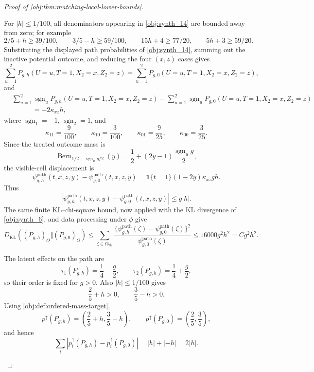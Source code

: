 \documentclass[11pt]{article}
\begin{document}
\begin{proof}[Proof of \cref{obj:thm:matching-local-lower-bounds}]
\begin{enumerate}
For \(|h|\le1/100\), all denominators appearing in \cref{obj:synth_14} are bounded away from zero; for example
\[
2/5+h\ge39/100,\qquad
3/5-h\ge59/100,\qquad
15h+4\ge77/20,\qquad
5h+3\ge59/20 .
\]
Substituting the displayed path probabilities of \cref{obj:synth_14}, summing out the inactive potential outcome, and reducing the four \((x,z)\) cases gives
\[
\sum_{u=1}^{2}P_{g,h}(U=u,T=1,X_2=x,Z_2=z)
=
\sum_{u=1}^{2}P_{g,0}(U=u,T=1,X_2=x,Z_2=z),
\]
and
\[
\begin{aligned}
&\sum_{u=1}^{2}\operatorname{sgn}_u
P_{g,h}(U=u,T=1,X_2=x,Z_2=z)
-
\sum_{u=1}^{2}\operatorname{sgn}_u
P_{g,0}(U=u,T=1,X_2=x,Z_2=z)  \\
&\hspace{3em}=
-2\kappa_{xz}h,
\end{aligned}
\]
where \(\operatorname{sgn}_1=-1\), \(\operatorname{sgn}_2=1\), and
\[
\kappa_{11}=\frac9{100},\qquad
\kappa_{10}=\frac3{100},\qquad
\kappa_{01}=\frac9{25},\qquad
\kappa_{00}=\frac3{25}.
\]
Since the treated outcome mass is
\[
\operatorname{Bern}_{1/2+\operatorname{sgn}_u g/2}(y)
=
\frac12+(2y-1)\frac{\operatorname{sgn}_u g}{2},
\]
the visible-cell displacement is
\[
\psi^{\mathrm{path}}_{g,h}(t,x,z,y)-\psi^{\mathrm{path}}_{g,0}(t,x,z,y)
=
\mathbf 1\{t=1\}(1-2y)\kappa_{xz}gh .
\]
Thus
\[
\left|\psi^{\mathrm{path}}_{g,h}(t,x,z,y)-\psi^{\mathrm{path}}_{g,0}(t,x,z,y)\right|
\le g|h|.
\]
The same finite KL--chi-square bound, now applied with the KL divergence of \cref{obj:synth_6}, and data processing under \(\phi\) give
\[
D_{\mathrm{KL}}\!\left((P_{g,h})_O\Vert(P_{g,0})_O\right)
\le
\sum_{\zeta\in\Omega_{\mathrm{vis}}}
\frac{\{\psi^{\mathrm{path}}_{g,h}(\zeta)-\psi^{\mathrm{path}}_{g,0}(\zeta)\}^2}
{\psi^{\mathrm{path}}_{g,0}(\zeta)}
\le
16000g^2h^2
=
C g^2h^2.
\]

The latent effects on the path are
\[
\tau_1(P_{g,h})=\frac14-\frac g2,
\qquad
\tau_2(P_{g,h})=\frac14+\frac g2,
\]
so their order is fixed for \(g>0\).  Also \(|h|\le1/100\) gives
\[
\frac25+h>0,\qquad \frac35-h>0.
\]
Using \cref{obj:def:ordered-mass-target},
\[
p^{\uparrow}(P_{g,h})=\left(\frac25+h,\frac35-h\right),
\qquad
p^{\uparrow}(P_{g,0})=\left(\frac25,\frac35\right),
\]
and hence
\[
\sum_i\left|p_i^{\uparrow}(P_{g,h})-p_i^{\uparrow}(P_{g,0})\right|
=
|h|+|-h|
=
2|h|.
\] %


\end{enumerate}
\end{proof}
\end{document}
